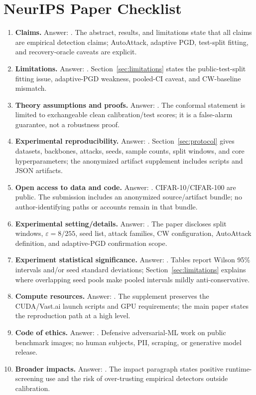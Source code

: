 \section*{NeurIPS Paper Checklist}
\begin{enumerate}[leftmargin=*]
\item \textbf{Claims.} Answer: \answerYes{}. The abstract, results, and limitations state that all claims are empirical detection claims; AutoAttack, adaptive PGD, test-split fitting, and recovery-oracle caveats are explicit.
\item \textbf{Limitations.} Answer: \answerYes{}. Section~\ref{sec:limitations} states the public-test-split fitting issue, adaptive-PGD weakness, pooled-CI caveat, and CW-baseline mismatch.
\item \textbf{Theory assumptions and proofs.} Answer: \answerYes{}. The conformal statement is limited to exchangeable clean calibration/test scores; it is a false-alarm guarantee, not a robustness proof.
\item \textbf{Experimental reproducibility.} Answer: \answerYes{}. Section~\ref{sec:protocol} gives datasets, backbones, attacks, seeds, sample counts, split windows, and core hyperparameters; the anonymized artifact supplement includes scripts and JSON artifacts.
\item \textbf{Open access to data and code.} Answer: \answerYes{}. CIFAR-10/CIFAR-100 are public. The submission includes an anonymized source/artifact bundle; no author-identifying paths or accounts remain in that bundle.
\item \textbf{Experimental setting/details.} Answer: \answerYes{}. The paper discloses split windows, $\varepsilon=8/255$, seed list, attack families, CW configuration, AutoAttack definition, and adaptive-PGD confirmation scope.
\item \textbf{Experiment statistical significance.} Answer: \answerYes{}. Tables report Wilson 95\% intervals and/or seed standard deviations; Section~\ref{sec:limitations} explains where overlapping seed pools make pooled intervals mildly anti-conservative.
\item \textbf{Compute resources.} Answer: \answerYes{}. The supplement preserves the CUDA/Vast.ai launch scripts and GPU requirements; the main paper states the reproduction path at a high level.
\item \textbf{Code of ethics.} Answer: \answerYes{}. Defensive adversarial-ML work on public benchmark images; no human subjects, PII, scraping, or generative model release.
\item \textbf{Broader impacts.} Answer: \answerYes{}. The impact paragraph states positive runtime-screening use and the risk of over-trusting empirical detectors outside calibration.

\end{enumerate}
